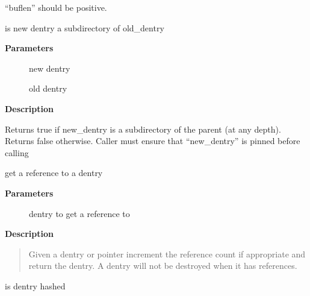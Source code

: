 \documentclass[a4paper,8pt,english]{sphinxmanual}
\begin{document}
``buflen'' should be positive.

\begin{fulllineitems}
\label{filesystems/index:c.is_subdir}
is new dentry a subdirectory of old\_dentry

\end{fulllineitems}


\textbf{Parameters}
\begin{description}
\item[{}] \leavevmode
new dentry

\item[{}] \leavevmode
old dentry

\end{description}

\textbf{Description}

Returns true if new\_dentry is a subdirectory of the parent (at any depth).
Returns false otherwise.
Caller must ensure that ``new\_dentry'' is pinned before calling {\hyperref[filesystems/index:c.is_subdir]{\emph{}}}

\begin{fulllineitems}
\label{filesystems/index:c.dget_dlock}
get a reference to a dentry

\end{fulllineitems}


\textbf{Parameters}
\begin{description}
\item[{}] \leavevmode
dentry to get a reference to

\end{description}

\textbf{Description}
\begin{quote}

Given a dentry or  pointer increment the reference count
if appropriate and return the dentry. A dentry will not be
destroyed when it has references.
\end{quote}

\begin{fulllineitems}
\label{filesystems/index:c.d_unhashed}
is dentry hashed

\end{fulllineitems}
\end{document}
